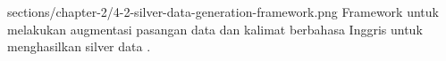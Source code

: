   {sections/chapter-2/4-2-silver-data-generation-framework.png}
  {Framework untuk melakukan augmentasi pasangan data \AMR{} dan kalimat berbahasa Inggris untuk menghasilkan silver data .}

